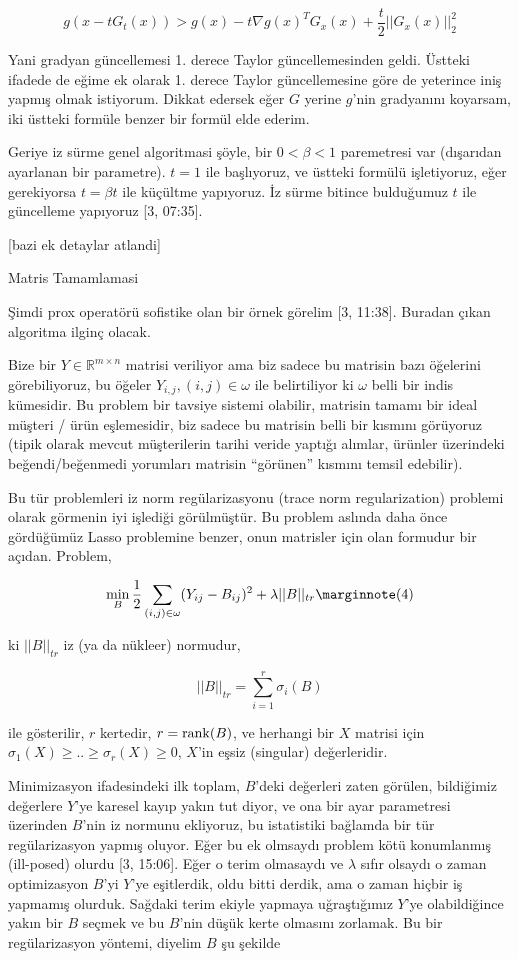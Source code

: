 \documentclass[12pt,fleqn]{article}\usepackage{../../common}
\begin{document}
$$
g(x - t G_t (x) ) > g(x) - t \nabla g(x)^T G_x(x) + \frac{t}{2} ||G_x(x)||_2^2
$$

Yani gradyan güncellemesi 1. derece Taylor güncellemesinden geldi. Üstteki
ifadede de eğime ek olarak 1. derece Taylor güncellemesine göre de
yeterince iniş yapmış olmak istiyorum. Dikkat edersek eğer $G$ yerine
$g$'nin gradyanını koyarsam, iki üstteki formüle benzer bir formül elde
ederim.

Geriye iz sürme genel algoritmasi şöyle, bir $0 < \beta < 1$ paremetresi
var (dışarıdan ayarlanan bir parametre). $t=1$ ile başlıyoruz, ve üstteki
formülü işletiyoruz, eğer gerekiyorsa $t = \beta t$ ile küçültme
yapıyoruz. İz sürme bitince bulduğumuz $t$ ile güncelleme yapıyoruz [3,
07:35].

[bazi ek detaylar atlandi]

Matris Tamamlamasi

Şimdi prox operatörü sofistike olan bir örnek görelim [3, 11:38]. Buradan
çıkan algoritma ilginç olacak. 

Bize bir $Y \in \mathbb{R}^{m \times n}$ matrisi veriliyor ama biz sadece
bu matrisin bazı öğelerini görebiliyoruz, bu öğeler
$Y_{i,j}, (i,j) \in \omega$ ile belirtiliyor ki $\omega$ belli bir indis
kümesidir. Bu problem bir tavsiye sistemi olabilir, matrisin tamamı bir
ideal müşteri / ürün eşlemesidir, biz sadece bu matrisin belli bir kısmını
görüyoruz (tipik olarak mevcut müşterilerin tarihi veride yaptığı alımlar,
ürünler üzerindeki beğendi/beğenmedi yorumları matrisin ``görünen'' kısmını
temsil edebilir). 

Bu tür problemleri iz norm regülarizasyonu (trace norm regularization)
problemi olarak görmenin iyi işlediği görülmüştür. Bu problem aslında daha
önce gördüğümüz Lasso problemine benzer, onun matrisler için olan formudur
bir açıdan. Problem,

$$
\min_B \frac{1}{2} \sum_{(i,j) \in \omega} (Y_{ij} - B_{ij})^2 + \lambda ||B||_{tr}
\mlabel{4}
$$

ki $||B||_{tr}$ iz (ya da nükleer) normudur, 

$$
||B||_{tr} = \sum_{i=1}^{r} \sigma_i(B)
$$

ile gösterilir, $r$ kertedir, $r = \operatorname{rank}(B)$, ve herhangi bir $X$ matrisi
için $\sigma_1(X) \ge .. \ge \sigma_r(X) \ge 0$, $X$'in eşsiz (singular)
değerleridir.

Minimizasyon ifadesindeki ilk toplam, $B$'deki değerleri zaten görülen,
bildiğimiz değerlere $Y$'ye karesel kayıp yakın tut diyor, ve ona bir ayar
parametresi üzerinden $B$'nin iz normunu ekliyoruz, bu istatistiki bağlamda
bir tür regülarizasyon yapmış oluyor. Eğer bu ek olmsaydı problem kötü
konumlanmış (ill-posed) olurdu [3, 15:06]. Eğer o terim olmasaydı ve
$\lambda$ sıfır olsaydı o zaman optimizasyon $B$'yi $Y$'ye eşitlerdik, oldu
bitti derdik, ama o zaman hiçbir iş yapmamış olurduk. Sağdaki terim ekiyle
yapmaya uğraştığımız $Y$'ye olabildiğince yakın bir $B$ seçmek ve bu
$B$'nin düşük kerte olmasını zorlamak. Bu bir regülarizasyon yöntemi,
diyelim $B$ şu şekilde 
\end{document}
